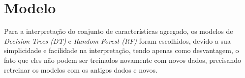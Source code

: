 \section{Modelo}

Para a interpretação do conjunto de características 
agregado, os modelos de \emph{Decision Trees (DT)} e 
\emph{Random Forest (RF)} foram escolhidos, devido a 
sua simplicidade e facilidade na interpretação, tendo apenas 
como desvantagem, o fato que eles não podem ser treinados 
novamente com novos dados, precisando retreinar os modelos 
com os antigos dados e novos.